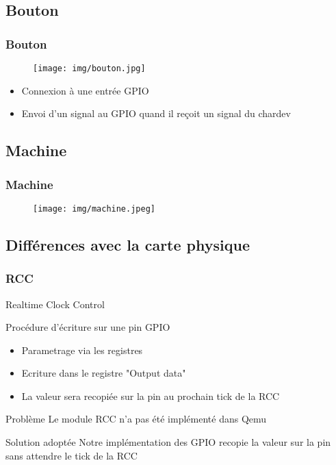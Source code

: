 \documentclass{beamer}
\begin{document}
		\subsection{Bouton}
			\begin{frame}
				\frametitle{Bouton}
				\begin{figure}
					\texttt{[image: img/bouton.jpg]}
				\end{figure}
				\begin{itemize}
					\item Connexion à une entrée GPIO
					\item Envoi d'un signal au GPIO quand il reçoit un signal du chardev
				\end{itemize}
			\end{frame}
			
		\subsection{Machine}
			\begin{frame}
				\frametitle{Machine}
				\begin{figure}
					\texttt{[image: img/machine.jpeg]}
				\end{figure}
			\end{frame}
		
		
		\subsection{Différences avec la carte physique}
			\begin{frame}
				\frametitle{RCC}
				Realtime Clock Control
				\begin{block}{ Procédure d'écriture sur une pin GPIO }
					\begin{itemize}
						\item Parametrage via les registres
						\item Ecriture dans le registre "Output data"
						\item La valeur sera recopiée sur la pin au prochain tick de la RCC
					\end{itemize}
				\end{block}
				\begin{alertblock}{ Problème }
					Le module RCC n'a pas été implémenté dans Qemu
				\end{alertblock}
				\begin{exampleblock}{ Solution adoptée }
					Notre implémentation des GPIO recopie la valeur sur la pin sans attendre le tick de la RCC
				\end{exampleblock}
				
			\end{frame}
		
\end{document}
